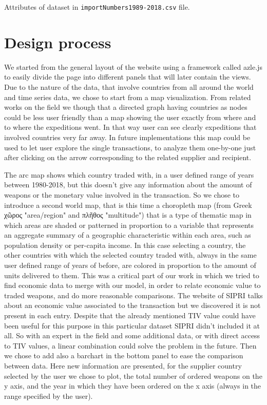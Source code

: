 \documentclass{article}
\begin{document}
\begin{multicols}{2}
\begin{center}
\begin{table}[hbt!]
\caption { \label { tab:d2} Attributes of dataset in \texttt{importNumbers1989-2018.csv} file.   }

\end{table}


\end{center}


\section{Design process}
%

We started from the general layout of the website using a framework called azle.js to easily divide the page into different panels that will later contain the views.
Due to the nature of the data, that involve countries from all around the world and time series data, we chose to start from a map visualization.
From related works on the field we though that a directed graph having countries as nodes could be less user friendly than a map showing the user exactly from where and to where the expeditions went. In that way user can see clearly expeditions that involved countries very far away. In future implementations this map could be used to let user explore the single transactions, to analyze them one-by-one just after clicking on the arrow corresponding to the related supplier and recipient.

The arc map shows which country traded with, in a user defined range of years between 1980-2018, but this doesn’t give any information about the amount of weapons or the monetary value involved in the transaction. So we chose to introduce a second world map, that is this time a choropleth map (from Greek χῶρος "area/region" and πλῆθος "multitude") that is a type of thematic map in which areas are shaded or patterned in proportion to a variable that represents an aggregate summary of a geographic characteristic within each area, such as population density or per-capita income. In this case selecting a country, the other countries with which the selected country traded with, always in the same user defined range of years of before, are colored in proportion to the amount of units delivered  to them.
This was a critical part of our work in which we tried to find economic data to merge with our model, in order to relate economic value to traded weapons, and do more reasonable comparisons. The website of SIPRI talks about an economic value associated to the transaction but we discovered it is not present in each entry. Despite that the already mentioned TIV value could have been useful for this purpose in this particular dataset SIPRI didn’t included it at all. So with an expert in the field and some additional data, or with direct access to TIV values, a linear combination could solve the problem in the future.
Then we chose to add also a barchart in the bottom panel to ease the comparison between data. Here new information are presented, for the supplier country selected by the user we chose to plot, the total number of ordered weapons on the y axis, and the year in which they have been ordered on the x axis (always in the range specified by the user).


\end{multicols}
\end{document}
